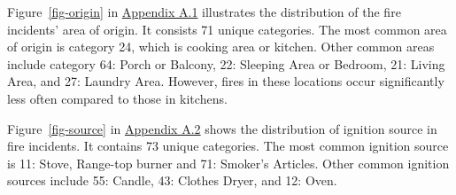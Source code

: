 \documentclass[
  letterpaper,
  DIV=11,
  numbers=noendperiod]{scrartcl}
\begin{document}
Figure~\ref{fig-origin} in \hyperref[sec-origin-fig]{Appendix A.1}
illustrates the distribution of the fire incidents' area of origin. It
consists 71 unique categories. The most common area of origin is
category 24, which is cooking area or kitchen. Other common areas
include category 64: Porch or Balcony, 22: Sleeping Area or Bedroom, 21:
Living Area, and 27: Laundry Area. However, fires in these locations
occur significantly less often compared to those in kitchens.

Figure~\ref{fig-source} in \hyperref[sec-source-fig]{Appendix A.2} shows
the distribution of ignition source in fire incidents. It contains 73
unique categories. The most common ignition source is 11: Stove,
Range-top burner and 71: Smoker's Articles. Other common ignition
sources include 55: Candle, 43: Clothes Dryer, and 12: Oven.
\end{document}
